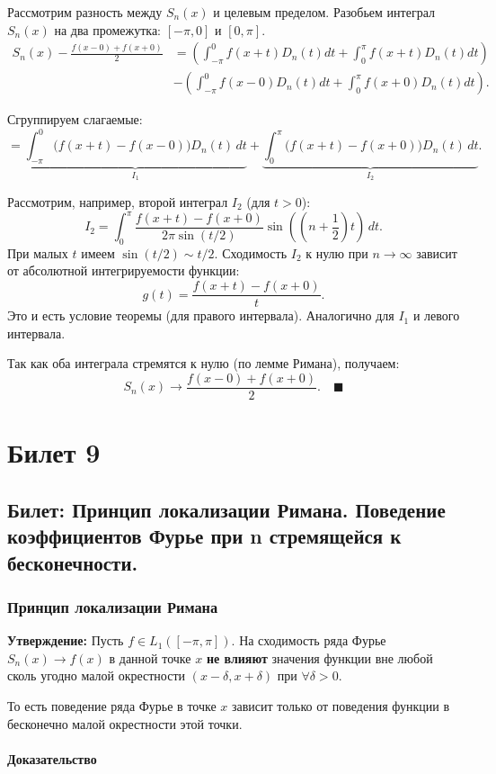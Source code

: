 \documentclass[12pt,a4paper,openany]{book}
\begin{document}
Рассмотрим разность между $S_n(x)$ и целевым пределом. Разобьем интеграл $S_n(x)$ на два промежутка: $[-\pi, 0]$ и $[0, \pi]$.
\begin{align*}
S_n(x) - \frac{f(x-0) + f(x+0)}{2} &= \left( \int_{-\pi}^{0} f(x+t)D_n(t)dt + \int_{0}^{\pi} f(x+t)D_n(t)dt \right) \\
&- \left( \int_{-\pi}^{0} f(x-0)D_n(t)dt + \int_{0}^{\pi} f(x+0)D_n(t)dt \right).
\end{align*}

Сгруппируем слагаемые:
$$ = \underbrace{\int_{-\pi}^{0} \big( f(x+t) - f(x-0) \big) D_n(t) \, dt}_{I_1} + \underbrace{\int_{0}^{\pi} \big( f(x+t) - f(x+0) \big) D_n(t) \, dt}_{I_2}. $$

Рассмотрим, например, второй интеграл $I_2$ (для $t > 0$):
$$ I_2 = \int_{0}^{\pi} \frac{f(x+t) - f(x+0)}{2\pi \sin(t/2)} \sin\left(\left(n + \frac{1}{2}\right)t\right) \, dt. $$
При малых $t$ имеем $\sin(t/2) \sim t/2$.
Сходимость $I_2$ к нулю при $n \to \infty$ зависит от абсолютной интегрируемости функции:
$$ g(t) = \frac{f(x+t) - f(x+0)}{t}. $$
Это и есть условие теоремы (для правого интервала). Аналогично для $I_1$ и левого интервала.

Так как оба интеграла стремятся к нулю (по лемме Римана), получаем:
$$ S_n(x) \to \frac{f(x-0) + f(x+0)}{2}. \quad \blacksquare $$

\chapter{Билет 9}
\section{Билет: Принцип локализации Римана. Поведение коэффициентов Фурье при n стремящейся к бесконечности.}

\subsection{Принцип локализации Римана}

\textbf{Утверждение:}
Пусть $f \in L_1([-\pi, \pi])$.
На сходимость ряда Фурье $S_n(x) \to f(x)$ в данной точке $x$ \textbf{не влияют} значения функции вне любой сколь угодно малой окрестности $(x-\delta, x+\delta)$ при $\forall \delta > 0$.

То есть поведение ряда Фурье в точке $x$ зависит только от поведения функции в бесконечно малой окрестности этой точки.

\subsubsection*{Доказательство}
\end{document}
